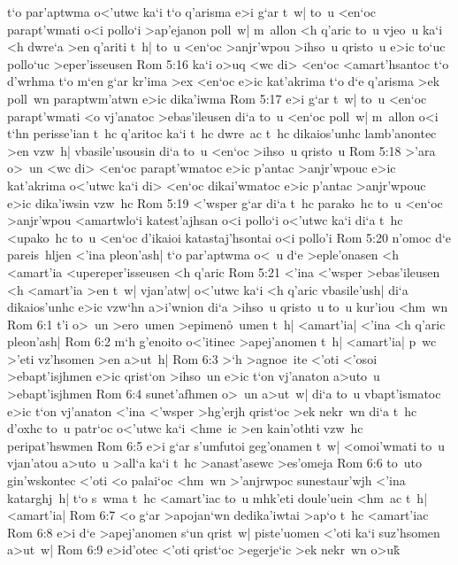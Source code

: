 t`o
par'aptwma
o<'utwc
ka`i
t`o
q'arisma
e>i
g`ar
t~w|
to~u
<en`oc
parapt'wmati
o<i
pollo`i
>ap'ejanon
poll~w|
m~allon
<h
q'aric
to~u
vjeo~u
ka`i
<h
dwre`a
>en
q'ariti
t~h|
to~u
<en`oc
>anjr'wpou
>ihso~u
qristo~u
e>ic
to`uc
pollo`uc
>eper'isseusen\bibvsend
\vs Rom 5:16
ka`i
o>uq
<wc
di>
<en`oc
<amart'hsantoc
t`o
d'wrhma
t`o
m`en
g`ar
kr'ima
>ex
<en`oc
e>ic
kat'akrima
t`o
d`e
q'arisma
>ek
poll~wn
paraptwm'atwn
e>ic
dika'iwma\bibvsend
\vs Rom 5:17
e>i
g`ar
t~w|
to~u
<en`oc
parapt'wmati
<o
vj'anatoc
>ebas'ileusen
di`a
to~u
<en`oc
poll~w|
m~allon
o<i
t`hn
perisse'ian
t~hc
q'aritoc
ka`i
t~hc
dwre~ac
t~hc
dikaios'unhc
lamb'anontec
>en
vzw~h|
vbasile'usousin
di`a
to~u
<en`oc
>ihso~u
qristo~u\bibvsend
\vs Rom 5:18
>'ara
o>~un
<wc
di>
<en`oc
parapt'wmatoc
e>ic
p'antac
>anjr'wpouc
e>ic
kat'akrima
o<'utwc
ka`i
di>
<en`oc
dikai'wmatoc
e>ic
p'antac
>anjr'wpouc
e>ic
dika'iwsin
vzw~hc\bibvsend
\vs Rom 5:19
<'wsper
g`ar
di`a
t~hc
parako~hc
to~u
<en`oc
>anjr'wpou
<amartwlo`i
katest'ajhsan
o<i
pollo`i
o<'utwc
ka`i
di`a
t~hc
<upako~hc
to~u
<en`oc
d'ikaioi
katastaj'hsontai
o<i
pollo'i\bibvsend
\vs Rom 5:20
n'omoc
d`e
pareis~hljen
<'ina
pleon'ash|
t`o
par'aptwma
o<~u
d`e
>eple'onasen
<h
<amart'ia
<upereper'isseusen
<h
q'aric\bibvsend
\vs Rom 5:21
<'ina
<'wsper
>ebas'ileusen
<h
<amart'ia
>en
t~w|
vjan'atw|
o<'utwc
ka`i
<h
q'aric
vbasile'ush|
di`a
dikaios'unhc
e>ic
vzw`hn
a>i'wnion
di`a
>ihso~u
qristo~u
to~u
kur'iou
<hm~wn\bibvsend
\vs Rom 6:1
t'i
o>~un
>ero~umen
>epimen\r{o}~umen
t~h|
<amart'ia|
<'ina
<h
q'aric
pleon'ash|\bibvsend
\vs Rom 6:2
m`h
g'enoito
o<'itinec
>apej'anomen
t~h|
<amart'ia|
p~wc
>'eti
vz'hsomen
>en
a>ut~h|\bibvsend
\vs Rom 6:3
>`h
>agnoe~ite
<'oti
<'osoi
>ebapt'isjhmen
e>ic
qrist`on
>ihso~un
e>ic
t`on
vj'anaton
a>uto~u
>ebapt'isjhmen\bibvsend
\vs Rom 6:4
sunet'afhmen
o>~un
a>ut~w|
di`a
to~u
vbapt'ismatoc
e>ic
t`on
vj'anaton
<'ina
<'wsper
>hg'erjh
qrist`oc
>ek
nekr~wn
di`a
t~hc
d'oxhc
to~u
patr`oc
o<'utwc
ka`i
<hme~ic
>en
kain'othti
vzw~hc
peripat'hswmen\bibvsend
\vs Rom 6:5
e>i
g`ar
s'umfutoi
geg'onamen
t~w|
<omoi'wmati
to~u
vjan'atou
a>uto~u
>all`a
ka`i
t~hc
>anast'asewc
>es'omeja\bibvsend
\vs Rom 6:6
to~uto
gin'wskontec
<'oti
<o
palai`oc
<hm~wn
>'anjrwpoc
sunestaur'wjh
<'ina
katarghj~h|
t`o
s~wma
t~hc
<amart'iac
to~u
mhk'eti
doule'uein
<hm~ac
t~h|
<amart'ia|\bibvsend
\vs Rom 6:7
<o
g`ar
>apojan`wn
dedika'iwtai
>ap`o
t~hc
<amart'iac\bibvsend
\vs Rom 6:8
e>i
d`e
>apej'anomen
s`un
qrist~w|
piste'uomen
<'oti
ka`i
suz'hsomen
a>ut~w|\bibvsend
\vs Rom 6:9
e>id'otec
<'oti
qrist`oc
>egerje`ic
>ek
nekr~wn
o>uk\r{}
